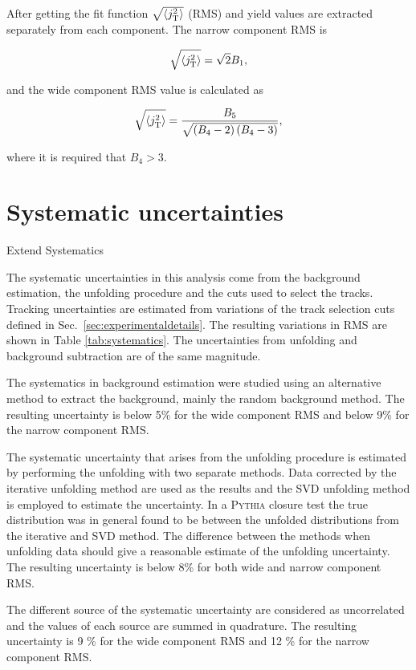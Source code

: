 After getting the fit function $\sqrt{\left<j_{\rm T}^2\right>}$ (RMS) and yield values are  extracted separately from each component. The narrow component RMS is

$$\sqrt{\left<j_{\rm T}^2\right>}=\sqrt{2}B_1,$$

and the wide component RMS value is calculated as 

$$\sqrt{\left<j_{\rm T}^2\right>}=\frac{B_5}{\sqrt{\left(B_4-2\right)\left(B_4-3\right)}},$$

where it is required that $B_4 > 3$.

\section{Systematic uncertainties}
{\color{red} Extend Systematics}

\label{sec:systematicerrors}
The systematic uncertainties in this analysis come from the background estimation, the unfolding procedure and the cuts used to select the tracks. Tracking uncertainties are estimated from variations of the track selection cuts defined in Sec.~\ref{sec:experimentaldetails}. The resulting variations in RMS are shown in Table \ref{tab:systematics}. The uncertainties from unfolding and background subtraction are of the same magnitude. 

The systematics in background estimation were studied using an alternative method to extract the background, mainly the random background method. The resulting uncertainty is below 5\% for the wide component RMS and below 9\% for the narrow component RMS. 

The systematic uncertainty that arises from the unfolding procedure is estimated by performing the unfolding with two separate methods. Data corrected by the iterative unfolding method are used as the results and the SVD unfolding method is employed to estimate the uncertainty. In a \textsc{Pythia} closure test the true distribution was in general found to be between the unfolded distributions from the iterative and SVD method. The difference between the methods when unfolding data should give a reasonable estimate of the unfolding uncertainty. The resulting uncertainty is below 8\% for both wide and narrow component RMS.

The different source of the systematic uncertainty are considered as uncorrelated and the values of each source are summed in quadrature. The resulting uncertainty is 9 \% for the wide component RMS and 12 \% for the narrow component RMS. 

